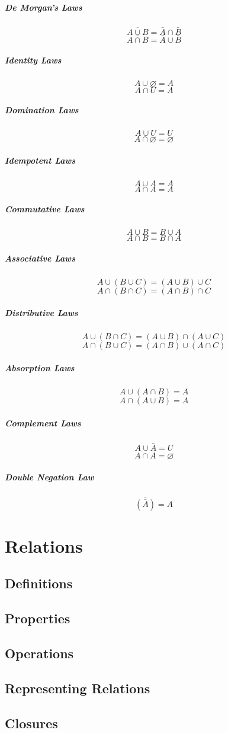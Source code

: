 \documentclass[a4paper, 10pt]{article}
\begin{document}
\begin{multicols}{2}
    \subparagraph{De Morgan's Laws}
    \[ \overline{A\cup B} = \bar{A}\cap\bar{B} \]
    \[ \overline{A\cap B} = \bar{A}\cup\bar{B} \]

    \subparagraph{Identity Laws}
    \[ A\cup\varnothing = A \]
    \[ A\cap U = A \]

    \subparagraph{Domination Laws}
    \[ A\cup U = U \]
    \[ A\cap\varnothing = \varnothing \]

    \subparagraph{Idempotent Laws}
    \[ A\cup A = A \]
    \[ A\cap A = A \]

    \subparagraph{Commutative Laws}
    \[ A\cup B = B\cup A \]
    \[ A\cap B = B\cap A \]

    \subparagraph{Associative Laws}
    \[ A\cup(B\cup C) = (A\cup B)\cup C \]
    \[ A\cap(B\cap C) = (A\cap B)\cap C \]

    \subparagraph{Distributive Laws}
    \[ A\cup(B\cap C) = (A\cup B)\cap (A\cup C) \]
    \[ A\cap(B\cup C) = (A\cap B)\cup (A\cap C) \]

    \subparagraph{Absorption Laws}
    \[ A\cup(A\cap B) = A \]
    \[ A\cap(A\cup B) = A \]

    \subparagraph{Complement Laws}
    \[ A\cup\bar{A} = U \]
    \[ A\cap\bar{A} = \varnothing \]

    \subparagraph{Double Negation Law}
    \[ \overline{\left(\bar{A}\right)} = A \]
\end{multicols}

\newpage
\section{Relations}
\subsection{Definitions}
\subsection{Properties}
\subsection{Operations}
\subsection{Representing Relations}
\subsection{Closures}
\end{document}
